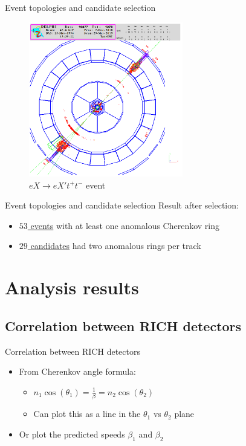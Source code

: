 \documentclass{beamer}
\begin{document}
\begin{frame}{Event topologies and candidate selection}
  \begin{figure}
    \centering
    \includegraphics[width = 0.6\textwidth]{Topology3.png}
    \caption{$eX\to eX't^+t^-$ event}
  \end{figure}
\end{frame}

\begin{frame}{Event topologies and candidate selection}
  Result after selection:
  \vspace{0.6cm}
  \begin{itemize}
    \setlength\itemsep{1.5em}
    \item{\underline{$53$ events} with at least one anomalous Cherenkov ring}
    \item{\underline{$29$ candidates} had two anomalous rings per track}
  \end{itemize}
\end{frame}

\section{Analysis results}
\subsection{Correlation between RICH detectors}
\begin{frame}{Correlation between RICH detectors}
  \begin{itemize}
    \setlength\itemsep{2.5em}
    \item{From Cherenkov angle formula:}
    \begin{itemize}
      \setlength\itemsep{0.5em}
      \item{$n_1\cos(\theta_1) = \frac{1}{\beta} = n_2\cos(\theta_2)$}
      \item{Can plot this as a line in the $\theta_1$ vs $\theta_2$ plane}
    \end{itemize}
    \item{Or plot the predicted speeds $\beta_1$ and $\beta_2$}
  \end{itemize}
\end{frame}
\end{document}
